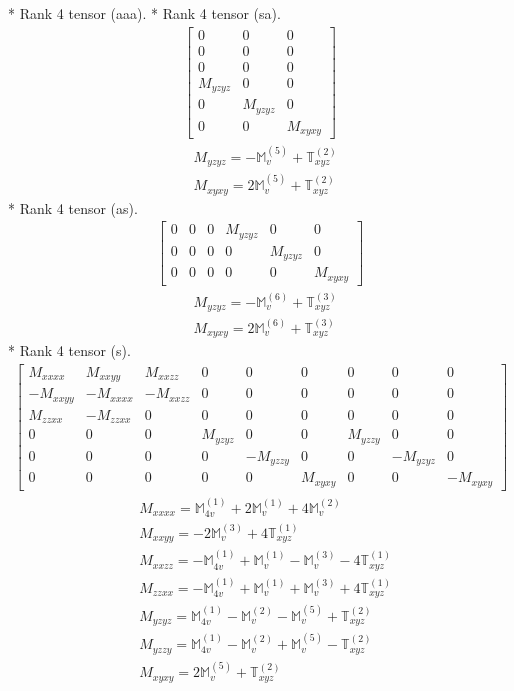 \documentclass[fleqn,8pt,landscape]{jsarticle}
\begin{document}
* Rank 4 tensor (aaa).
* Rank 4 tensor (sa).
\begin{align*}
\begin{bmatrix} 0 & 0 & 0 \\ 0 & 0 & 0 \\ 0 & 0 & 0 \\ M_{yzyz} & 0 & 0 \\ 0 & M_{yzyz} & 0 \\ 0 & 0 & M_{xyxy} \end{bmatrix}
\end{align*}
\begin{align*}
& M_{yzyz} = - \mathbb{M}_{v}^{(5)} + \mathbb{T}_{xyz}^{(2)} \\
& M_{xyxy} = 2 \mathbb{M}_{v}^{(5)} + \mathbb{T}_{xyz}^{(2)}
\end{align*}
* Rank 4 tensor (as).
\begin{align*}
\begin{bmatrix} 0 & 0 & 0 & M_{yzyz} & 0 & 0 \\ 0 & 0 & 0 & 0 & M_{yzyz} & 0 \\ 0 & 0 & 0 & 0 & 0 & M_{xyxy} \end{bmatrix}
\end{align*}
\begin{align*}
& M_{yzyz} = - \mathbb{M}_{v}^{(6)} + \mathbb{T}_{xyz}^{(3)} \\
& M_{xyxy} = 2 \mathbb{M}_{v}^{(6)} + \mathbb{T}_{xyz}^{(3)}
\end{align*}
* Rank 4 tensor (s).
\begin{align*}
\begin{bmatrix} M_{xxxx} & M_{xxyy} & M_{xxzz} & 0 & 0 & 0 & 0 & 0 & 0 \\ - M_{xxyy} & - M_{xxxx} & - M_{xxzz} & 0 & 0 & 0 & 0 & 0 & 0 \\ M_{zzxx} & - M_{zzxx} & 0 & 0 & 0 & 0 & 0 & 0 & 0 \\ 0 & 0 & 0 & M_{yzyz} & 0 & 0 & M_{yzzy} & 0 & 0 \\ 0 & 0 & 0 & 0 & - M_{yzzy} & 0 & 0 & - M_{yzyz} & 0 \\ 0 & 0 & 0 & 0 & 0 & M_{xyxy} & 0 & 0 & - M_{xyxy} \end{bmatrix}
\end{align*}
\begin{align*}
& M_{xxxx} = \mathbb{M}_{4v}^{(1)} + 2 \mathbb{M}_{v}^{(1)} + 4 \mathbb{M}_{v}^{(2)} \\
& M_{xxyy} = - 2 \mathbb{M}_{v}^{(3)} + 4 \mathbb{T}_{xyz}^{(1)} \\
& M_{xxzz} = - \mathbb{M}_{4v}^{(1)} + \mathbb{M}_{v}^{(1)} - \mathbb{M}_{v}^{(3)} - 4 \mathbb{T}_{xyz}^{(1)} \\
& M_{zzxx} = - \mathbb{M}_{4v}^{(1)} + \mathbb{M}_{v}^{(1)} + \mathbb{M}_{v}^{(3)} + 4 \mathbb{T}_{xyz}^{(1)} \\
& M_{yzyz} = \mathbb{M}_{4v}^{(1)} - \mathbb{M}_{v}^{(2)} - \mathbb{M}_{v}^{(5)} + \mathbb{T}_{xyz}^{(2)} \\
& M_{yzzy} = \mathbb{M}_{4v}^{(1)} - \mathbb{M}_{v}^{(2)} + \mathbb{M}_{v}^{(5)} - \mathbb{T}_{xyz}^{(2)} \\
& M_{xyxy} = 2 \mathbb{M}_{v}^{(5)} + \mathbb{T}_{xyz}^{(2)}
\end{align*}
\end{document}
